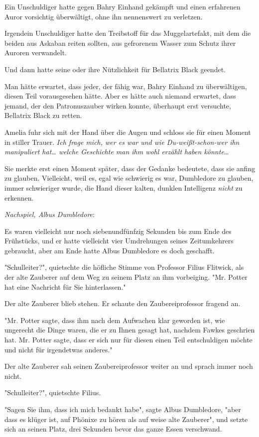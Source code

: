 {Ein Unschuldiger hatte gegen Bahry Einhand gekämpft und einen erfahrenen Auror vorsichtig überwältigt, ohne ihn nennenswert zu verletzen.

Irgendein Unschuldiger hatte den Treibstoff für das Muggelartefakt, mit dem die beiden aus Askaban reiten sollten, aus gefrorenem Wasser zum Schutz ihrer Auroren verwandelt.

Und dann hatte seine oder ihre Nützlichkeit für Bellatrix Black geendet.

Man hätte erwartet, dass jeder, der fähig war, Bahry Einhand zu überwältigen, diesen Teil vorausgesehen hätte. Aber es hätte auch niemand erwartet, dass jemand, der den Patronuszauber wirken konnte, überhaupt erst versuchte, Bellatrix Black zu retten.

Amelia fuhr sich mit der Hand über die Augen und schloss sie für einen Moment in stiller Trauer. \emph{Ich frage mich, wer es war und wie Du-weißt-schon-wer ihn manipuliert hat… welche Geschichte man ihm wohl erzählt haben könnte}…

Sie merkte erst einen Moment später, dass der Gedanke bedeutete, dass sie anfing zu glauben. Vielleicht, weil es, egal wie schwierig es war, Dumbledore zu glauben, immer schwieriger wurde, die Hand dieser kalten, dunklen Intelligenz \emph{nicht} zu erkennen.

\emph{Nachspiel, Albus Dumbledore}:

Es waren vielleicht nur noch siebenundfünfzig Sekunden bis zum Ende des Frühstücks, und er hatte vielleicht vier Umdrehungen seines Zeitumkehrers gebraucht, aber am Ende hatte Albus Dumbledore es doch geschafft.

"Schulleiter?", quietschte die höfliche Stimme von Professor Filius Flitwick, als der alte Zauberer auf dem Weg zu seinem Platz an ihm vorbeiging. "Mr. Potter hat eine Nachricht für Sie hinterlassen."

Der alte Zauberer blieb stehen. Er schaute den Zaubereiprofessor fragend an.

"Mr. Potter sagte, dass ihm nach dem Aufwachen klar geworden ist, wie ungerecht die Dinge waren, die er zu Ihnen gesagt hat, nachdem Fawkes geschrien hat. Mr. Potter sagte, dass er sich nur für diesen einen Teil entschuldigen möchte und nicht für irgendetwas anderes."

Der alte Zauberer sah seinen Zaubereiprofessor weiter an und sprach immer noch nicht.

"Schulleiter?", quietschte Filius.

"Sagen Sie ihm, dass ich mich bedankt habe", sagte Albus Dumbledore, "aber dass es klüger ist, auf Phönixe zu hören als auf weise alte Zauberer", und setzte sich an seinen Platz, drei Sekunden bevor das ganze Essen verschwand.

}
